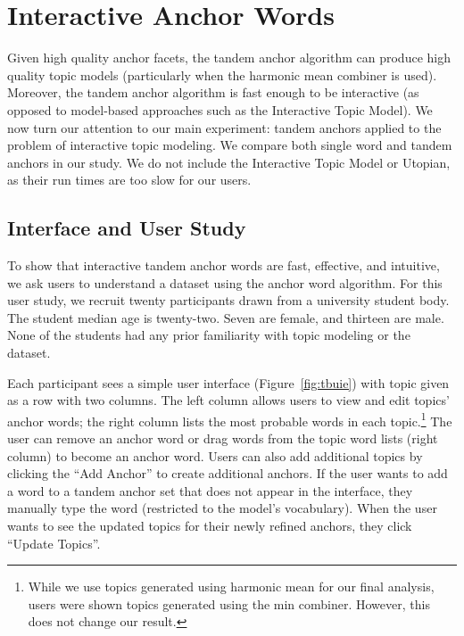 \begin{figure*}[t!]
\centering
\texttt{[image: \\filename\{figures/tbuie]}}
\caption{Interface for user study with multiword anchors applied to
interactive topic modeling.}
\label{fig:tbuie}
\end{figure*}

\section{Interactive Anchor Words}
\label{sec:interactive-experiments}

Given high quality anchor facets, the tandem anchor
algorithm can produce high quality topic models (particularly when the
harmonic mean combiner is used).
Moreover, the tandem anchor algorithm is fast enough to be interactive (as
opposed to model-based approaches such as the Interactive Topic Model).
We now turn our attention to our main experiment:
tandem anchors applied to the problem of interactive topic modeling.
We compare both single word and tandem anchors in our study.
We do not include the Interactive Topic Model or Utopian, as
their run times are too slow for our users.

\subsection{Interface and User Study}

To show that interactive tandem anchor words are fast, effective, and
intuitive, we ask users to understand a dataset using the anchor word
algorithm.
For this user study, we recruit twenty participants drawn from a university
student body.
The student median age is twenty-two.
Seven are female, and thirteen are male.
None of the students had any prior familiarity with topic
modeling or the \twentynews{} dataset.

Each participant sees a simple user interface
(Figure~\ref{fig:tbuie}) with topic given as a row with two columns.
The left column allows users to view and edit topics' anchor words;
the right column lists the most probable words in each
topic.\footnote{While we use topics generated using harmonic mean for
  our final analysis, users were shown topics generated using
  the min combiner.  However, this does not change our result.}
The user can remove an anchor word or drag words from the topic word lists
(right column) to become an anchor word.
Users can also add additional topics by clicking the ``Add Anchor'' to create
additional anchors.
If the user wants to add a word to a tandem anchor set that does not
appear in the interface, they manually type the word (restricted
to the model's vocabulary).
When the user wants to see the updated topics for their newly refined
anchors, they click ``Update Topics''.

